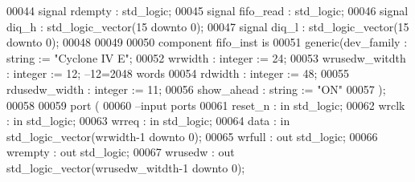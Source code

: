 \begin{DoxyCode}
00044     \textcolor{keywordflow}{signal} \textcolor{vhdlchar}{rdempty}    \textcolor{vhdlchar}{:} \textcolor{comment}{std\_logic};
00045     \textcolor{keywordflow}{signal} \textcolor{vhdlchar}{fifo_read}  \textcolor{vhdlchar}{:} \textcolor{comment}{std\_logic}; 
00046     \textcolor{keywordflow}{signal} \textcolor{vhdlchar}{diq_h} \textcolor{vhdlchar}{:} \textcolor{comment}{std\_logic\_vector}\textcolor{vhdlchar}{(}\textcolor{vhdllogic}{}\textcolor{vhdllogic}{15} \textcolor{keywordflow}{downto} \textcolor{vhdllogic}{}\textcolor{vhdllogic}{0}\textcolor{vhdlchar}{)}; 
00047     \textcolor{keywordflow}{signal} \textcolor{vhdlchar}{diq_l} \textcolor{vhdlchar}{:} \textcolor{comment}{std\_logic\_vector}\textcolor{vhdlchar}{(}\textcolor{vhdllogic}{}\textcolor{vhdllogic}{15} \textcolor{keywordflow}{downto} \textcolor{vhdllogic}{}\textcolor{vhdllogic}{0}\textcolor{vhdlchar}{)};  
00048     
00049     
00050     \textcolor{keywordflow}{component} fifo_inst \textcolor{keywordflow}{is}
00051   \textcolor{keywordflow}{generic}(dev_family         : \textcolor{comment}{string}  := \textcolor{keyword}{"Cyclone IV E"};
00052           wrwidth         : \textcolor{comment}{integer} := \textcolor{vhdllogic}{}\textcolor{vhdllogic}{24};
00053           wrusedw_witdth  : \textcolor{comment}{integer} := \textcolor{vhdllogic}{}\textcolor{vhdllogic}{12}; \textcolor{keyword}{--12=2048 words }
00054           rdwidth         : \textcolor{comment}{integer} := \textcolor{vhdllogic}{}\textcolor{vhdllogic}{48};
00055           rdusedw_width   : \textcolor{comment}{integer} := \textcolor{vhdllogic}{}\textcolor{vhdllogic}{11};
00056           show_ahead      : \textcolor{comment}{string}  := \textcolor{keyword}{"ON"}
00057   );  
00058 
00059   \textcolor{keywordflow}{port} (
00060 \textcolor{keyword}{      --input ports }
00061       reset_n       : \textcolor{keywordflow}{in} \textcolor{comment}{std\_logic};
00062       wrclk         : \textcolor{keywordflow}{in} \textcolor{comment}{std\_logic};
00063       wrreq         : \textcolor{keywordflow}{in} \textcolor{comment}{std\_logic};
00064       data          : \textcolor{keywordflow}{in} \textcolor{comment}{std\_logic\_vector}(wrwidth\textcolor{vhdlchar}{-}\textcolor{vhdllogic}{}\textcolor{vhdllogic}{1} \textcolor{keywordflow}{downto} \textcolor{vhdllogic}{}\textcolor{vhdllogic}{0});
00065       wrfull        : \textcolor{keywordflow}{out} \textcolor{comment}{std\_logic};
00066         wrempty       : \textcolor{keywordflow}{out} \textcolor{comment}{std\_logic};
00067       wrusedw       : \textcolor{keywordflow}{out} \textcolor{comment}{std\_logic\_vector}(wrusedw_witdth\textcolor{vhdlchar}{-}\textcolor{vhdllogic}{}\textcolor{vhdllogic}{1} \textcolor{keywordflow}{downto} \textcolor{vhdllogic}{}\textcolor{vhdllogic}{0});

\end{DoxyCode}
